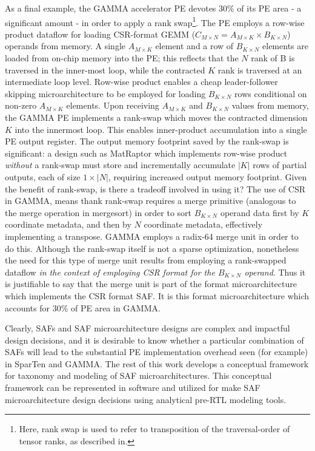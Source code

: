 As a final example, the GAMMA\cite{gamma} accelerator PE devotes 30\% of its PE area - a significant amount - in order to apply a rank swap\footnote{Here, rank swap is used to refer to transposition of the traversal-order of tensor ranks, as described in\cite{TODO}.}. The PE employs a row-wise product dataflow for loading CSR-format GEMM ($C_{M\times N} = A_{M\times K} \times B_{K\times N}$) operands from memory. A single $A_{M\times K}$ element and a row of $B_{K\times N}$ elements are loaded from on-chip memory into the PE; this reflects that the $N$ rank of B is traversed in the inner-most loop, while the contracted $K$ rank is traversed at an intermediate loop level. Row-wise product enables a cheap leader-follower skipping microarchitecture to be employed for loading $B_{K\times N}$ rows conditional on non-zero $A_{M\times K}$ elements. Upon receiving $A_{M\times K}$ and $B_{K\times N}$ values from memory, the GAMMA PE implements a rank-swap which moves the contracted dimension $K$ into the innermost loop. This enables inner-product accumulation into a single PE output register. The output memory footprint saved by the rank-swap is significant: a design such as MatRaptor\cite{matraptor} which implements row-wise product \textit{without} a rank-swap must store and incrementally accumulate $|K|$ rows of partial outputs, each of size $1 \times |N|$, requiring increased output memory footprint. Given the benefit of rank-swap, is there a tradeoff involved in using it? The use of CSR in GAMMA, means thank rank-swap requires a merge primitive (analogous to the merge operation in mergesort) in order to sort $B_{K\times N}$ operand data first by $K$ coordinate metadata, and then by $N$ coordinate metadata, effectively implementing a transpose. GAMMA employs a radix-64 merge unit\cite{gamma} in order to do this. Although the rank-swap itself is not a sparse optimization, nonetheless the need for this type of merge unit results from employing a rank-swapped dataflow \textit{in the context of employing CSR format for the $B_{K\times N}$ operand}. Thus it is justifiable to say that the merge unit is part of the format microarchitecture which implements the CSR format SAF. It is this format microarchitecture which accounts for 30\% of PE area in GAMMA.

Clearly, SAFs and SAF microarchitecture designs are complex and impactful design decisions, and it is desirable to know whether a particular combination of SAFs will lead to the substantial PE implementation overhead seen (for example) in SparTen and GAMMA. The rest of this work develops a conceptual framework for taxonomy and modeling of SAF microarchitectures. This conceptual framework can be represented in software and utilized for make SAF microarchitecture design decisions using analytical pre-RTL modeling tools.

